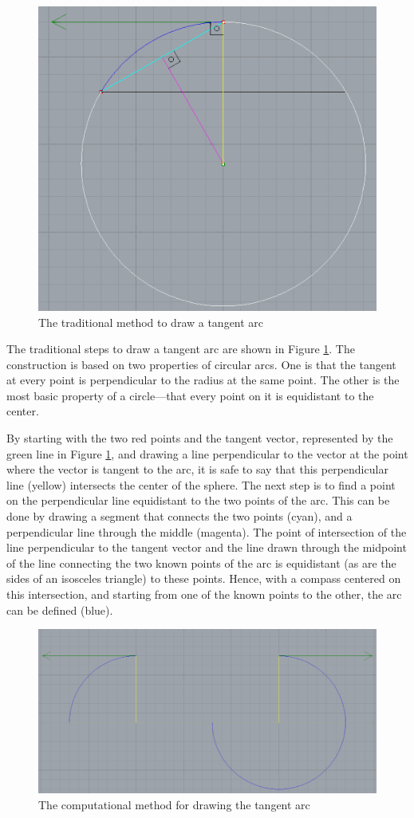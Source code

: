 \documentclass[preprint,12pt,3p]{elsarticle}
\begin{document}
\begin{figure}[!h]
\begin{center}
\includegraphics[width=0.5
\textwidth]{classicalarch.png}
\caption{The traditional method to draw a tangent arc}
\label{figura:classicalarch}
\end{center}
\end{figure}

The traditional steps to draw a tangent arc are shown in Figure \ref{figura:classicalarch}. The construction is based on two properties of circular arcs. One is that the tangent at every point is perpendicular to the radius at the same point. The other is the most basic property of a circle---that every point on it is equidistant to the center.

By starting with the two red points and the tangent vector, represented by the green line in Figure \ref{figura:classicalarch}, and drawing a line perpendicular to the vector at the point where the vector is tangent to the arc, it is safe to say that this perpendicular line (yellow) intersects the center of the sphere. The next step is to find a point on the perpendicular line equidistant to the two points of the arc. This can be done by drawing a segment that connects the two points (cyan), and a perpendicular line through the middle (magenta). The point of intersection of the line perpendicular to the tangent vector and the line drawn through the midpoint of the line connecting the two known points of the arc is equidistant (as are the sides of an isosceles triangle) to these points. Hence, with a compass centered on this intersection, and starting from one of the known points to the other, the arc can be defined (blue).

\begin{figure}[!h]
\begin{center}
\includegraphics[width=0.5
\textwidth]{computationalarch.png}
\caption{The computational method for drawing the tangent arc}
\label{figura:computationalarch}
\end{center}
\end{figure}
\end{document}
